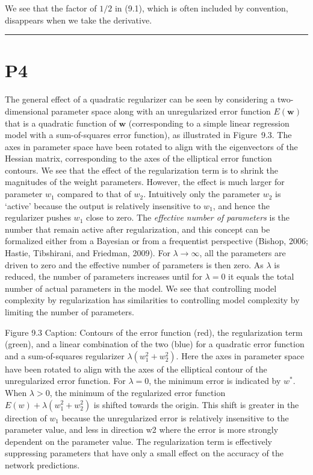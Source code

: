 \documentclass{article}
\begin{document}
We see that the factor of $1/2$ in (9.1), which is often included by convention, disappears when we take the derivative.

\noindent\rule{\linewidth}{0.4pt}

\section{P4}

The general effect of a quadratic regularizer can be seen by considering a two-dimensional parameter space along with an unregularized error function $E(\mathbf{w})$ that is a quadratic function of $\mathbf{w}$ (corresponding to a simple linear regression model with a sum-of-squares error function), as illustrated in Figure~9.3. The axes in parameter space have been rotated to align with the eigenvectors of the Hessian matrix, corresponding to the axes of the elliptical error function contours. We see that the effect of the regularization term is to shrink the magnitudes of the weight parameters. However, the effect is much larger for parameter $w_1$ compared to that of $w_2$. Intuitively only the parameter $w_2$ is `active' because the output is relatively insensitive to $w_1$, and hence the regularizer pushes $w_1$ close to zero. The \emph{effective number of parameters} is the number that remain active after regularization, and this concept can be formalized either from a Bayesian or from a frequentist perspective (Bishop, 2006; Hastie, Tibshirani, and Friedman, 2009). For $\lambda \to \infty$, all the parameters are driven to zero and the effective number of parameters is then zero. As $\lambda$ is reduced, the number of parameters increases until for $\lambda = 0$ it equals the total number of actual parameters in the model. We see that controlling model complexity by regularization has similarities to controlling model complexity by limiting the number of parameters.

Figure 9.3 Caption: Contours of the error function (red), the regularization term (green), and a linear combination of the two (blue) for a quadratic error function and a sum-of-squares regularizer $\lambda(w_1^2 + w_2^2)$. Here the axes in parameter space have been rotated to align with the axes of the elliptical contour of the unregularized error function. For $\lambda = 0$, the minimum error is indicated by $w^*$. When $\lambda > 0$, the minimum of the regularized error function $E(w) + \lambda(w_1^2 + w_2^2)$ is shifted towards the origin. This shift is greater in the direction of $w_1$ because the unregularized error is relatively insensitive to the parameter value, and less in direction w2 where the error is more strongly dependent on the parameter value. The regularization term is effectively suppressing parameters that have only a small effect on the accuracy of the network predictions.
\end{document}
